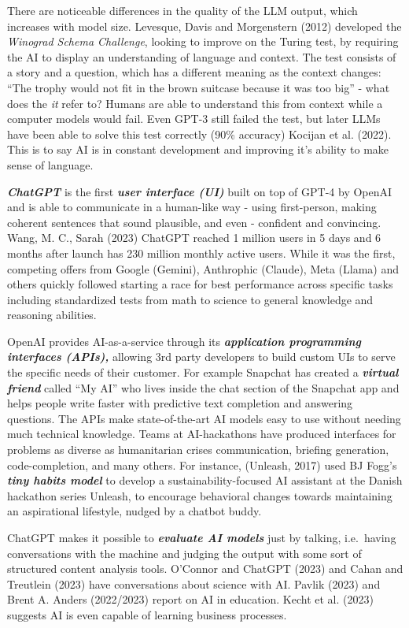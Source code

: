 \documentclass[
  letterpaper,
  DIV=11,
  numbers=noendperiod]{scrartcl}
\begin{document}
There are noticeable differences in the quality of the LLM output, which
increases with model size. Levesque, Davis and Morgenstern (2012)
developed the \emph{Winograd Schema Challenge}, looking to improve on
the Turing test, by requiring the AI to display an understanding of
language and context. The test consists of a story and a question, which
has a different meaning as the context changes: ``The trophy would not
fit in the brown suitcase because it was too big'' - what does the
\emph{it} refer to? Humans are able to understand this from context
while a computer models would fail. Even GPT-3 still failed the test,
but later LLMs have been able to solve this test correctly (90\%
accuracy) Kocijan et al. (2022). This is to say AI is in constant
development and improving it's ability to make sense of language.

\textbf{\emph{ChatGPT}} is the first \textbf{\emph{user interface (UI)}}
built on top of GPT-4 by OpenAI and is able to communicate in a
human-like way - using first-person, making coherent sentences that
sound plausible, and even - confident and convincing. Wang, M. C., Sarah
(2023) ChatGPT reached 1 million users in 5 days and 6 months after
launch has 230 million monthly active users. While it was the first,
competing offers from Google (Gemini), Anthrophic (Claude), Meta (Llama)
and others quickly followed starting a race for best performance across
specific tasks including standardized tests from math to science to
general knowledge and reasoning abilities.

OpenAI provides AI-as-a-service through its \textbf{\emph{application
programming interfaces (APIs),}} allowing 3rd party developers to build
custom UIs to serve the specific needs of their customer. For example
Snapchat has created a \textbf{\emph{virtual friend}} called ``My AI''
who lives inside the chat section of the Snapchat app and helps people
write faster with predictive text completion and answering questions.
The APIs make state-of-the-art AI models easy to use without needing
much technical knowledge. Teams at AI-hackathons have produced
interfaces for problems as diverse as humanitarian crises communication,
briefing generation, code-completion, and many others. For instance,
(Unleash, 2017) used BJ Fogg's \textbf{\emph{tiny habits model}} to
develop a sustainability-focused AI assistant at the Danish hackathon
series Unleash, to encourage behavioral changes towards maintaining an
aspirational lifestyle, nudged by a chatbot buddy.

ChatGPT makes it possible to \textbf{\emph{evaluate AI models}} just by
talking, i.e.~having conversations with the machine and judging the
output with some sort of structured content analysis tools. O'Connor and
ChatGPT (2023) and Cahan and Treutlein (2023) have conversations about
science with AI. Pavlik (2023) and Brent A. Anders (2022/2023) report on
AI in education. Kecht et al. (2023) suggests AI is even capable of
learning business processes.
\end{document}
